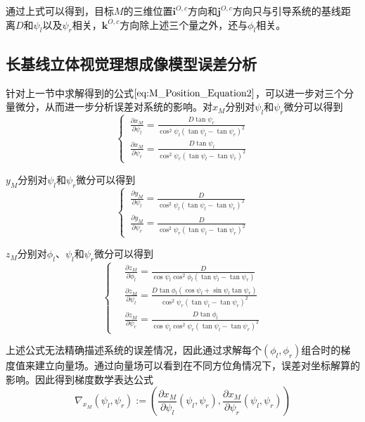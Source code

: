 通过上式可以得到，目标$M$的三维位置$\mathbf{i}^{O,c}$方向和$\mathbf{j}^{O,c}$方向只与引导系统的基线距离$D$和$\psi_l$以及$\psi_r$相关，$\mathbf{k}^{O,c}$方向除上述三个量之外，还与$\phi_l$相关。

\subsection{长基线立体视觉理想成像模型误差分析}
针对上一节中求解得到的公式$\ref{eq:M_Position_Equation2}$，可以进一步对三个分量微分，从而进一步分析误差对系统的影响。对$x_M$分别对$\psi_l$和$\psi_r$微分可以得到
\begin{equation}
\left\{ \,
\begin{aligned}
\frac{ \partial x_M}{ \partial \psi_l} = \frac{D \tan \psi_r}{ \cos^2 \psi_l (\tan \psi_l - \tan \psi_r)^2} \\
\frac{ \partial x_M}{\partial \psi_r} = \frac{D \tan \psi_l}{\cos^2 \psi_r (\tan \psi_l - \tan \psi_r)^2} 
\end{aligned}
\right.
\end{equation}

$y_M$分别对$\psi_l$和$\psi_r$微分可以得到
\begin{equation}
\left\{ \,
\begin{aligned}
\frac{\partial y_M}{\partial \psi_l} = \frac{ D}{\cos^2 \psi_l (\tan \psi_l - \tan \psi_r)^2} \\
\frac{\partial y_M}{\partial \psi_r} = \frac{D}{\cos^2 \psi_r (\tan \psi_l - \tan \psi_r)^2} 
\end{aligned}
\right.	
\end{equation}

$z_M$分别对$\phi_l$、$\psi_l$和$\psi_r$微分可以得到
\begin{equation}
\left\{ \,
\begin{aligned}
&\frac{ \partial z_M}{ \partial \phi_l} = \frac{D}{ \cos \psi_l \cos^2 \phi_l (\tan \psi_l - \tan \psi_r)} \\
&\frac{\partial z_M}{\partial \psi_l} = \frac{ D \tan \phi_l(\cos \psi_l + \sin \psi_l \tan \psi_r)}{ \cos^2 \psi_r (\tan \psi_l - \tan \psi_r)^2} \\
&\frac{ \partial z_M}{ \partial \psi_r} = \frac{ D \tan \phi_l}{ \cos \psi_l \cos^2 \psi_r (\tan \psi_l - \tan \psi_r)^2}
\end{aligned}
\right.
\end{equation} 

上述公式无法精确描述系统的误差情况，因此通过求解每个$(\phi_l, \phi_r)$组合时的梯度值来建立向量场。通过向量场可以看到在不同方位角情况下，误差对坐标解算的影响。因此得到梯度数学表达公式
\begin{equation}
\nabla_{x_M}(\psi_l, \psi_r):=\left( \frac{\partial x_M}{\partial \psi_l}(\psi_l, \psi_r), \frac{\partial x_M}{\partial \psi_r}(\psi_l, \psi_r)  \right)
\end{equation}

